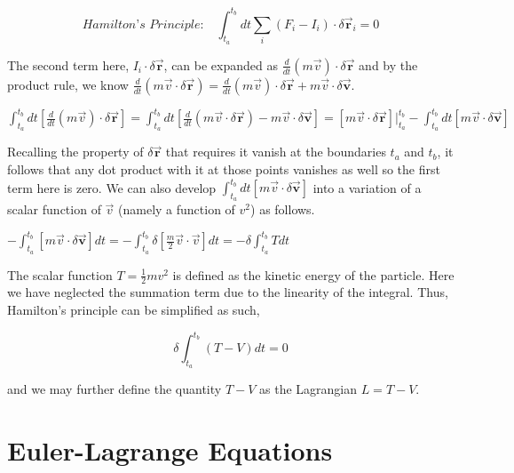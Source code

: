 \documentclass{article}\usepackage[]{graphicx}\usepackage[]{color}
\begin{document}
\begin{equation}
\textit{Hamilton's Principle:} \quad\int_{t_a}^{t_b}dt \sum_{i}{(F_{i}-I_{i})\cdot\delta \vec{\textbf{r}}_{i}}=0
\end{equation}

The second term here, $I_i\cdot\delta \vec{\textbf{r}}$, can be expanded as $\frac{d}{dt}(m\vec{v})\cdot\delta \vec{\textbf{r}}$ and by the product rule, we know $\frac{d}{dt}(m\vec{v}\cdot \delta \vec{\textbf{r}})=\frac{d}{dt}(m\vec{v})\cdot \delta\vec{\textbf{r}}+m\vec{v}\cdot\delta\vec{\textbf{v}}$.

\begin{center}

$\int_{t_a}^{t_b}dt\left[\frac{d}{dt}(m\vec{v})\cdot\delta \vec{\textbf{r}}\right]
=\int_{t_a}^{t_b}dt\left[ \frac{d}{dt}(m\vec{v}\cdot \delta \vec{\textbf{r}})-m\vec{v}\cdot\delta\vec{\textbf{v}}\right]
=[m\vec{v}\cdot \delta \vec{\textbf{r}}]\vert_{t_a}^{t_b}-\int_{t_a}^{t_b}dt[m\vec{v}\cdot\delta\vec{\textbf{v}}]$

\end{center}

Recalling the property of $\delta\vec{\textbf{r}}$ that requires it vanish at the boundaries $t_a$ and $t_b$, it follows that any dot product with it at those points vanishes as well so the first term here is zero. We can also develop $\int_{t_a}^{t_b}dt[m\vec{v}\cdot\delta\vec{\textbf{v}}]$ into a variation of a scalar function of $\vec{v}$ (namely a function of $v^2$) as follows. 

\begin{center}

$-\int_{t_a}^{t_b}[m\vec{v}\cdot\delta\vec{\textbf{v}}]dt=-\int_{t_a}^{t_b}\delta\left[ \frac{m}{2}\vec{v}\cdot\vec{v}\right] dt
=-\delta\int_{t_a}^{t_b}Tdt$

\end{center}

The scalar function $T=\frac{1}{2}mv^2$ is defined as the kinetic energy of the particle. Here we have neglected the summation term due to the linearity of the integral. Thus, Hamilton's principle can be simplified as such,

\begin{equation}
\delta\int_{t_a}^{t_b}(T-V)dt=0
\end{equation}

and we may further define the quantity $T-V$ as the Lagrangian $L=T-V$.

\section{Euler-Lagrange Equations}
\end{document}
